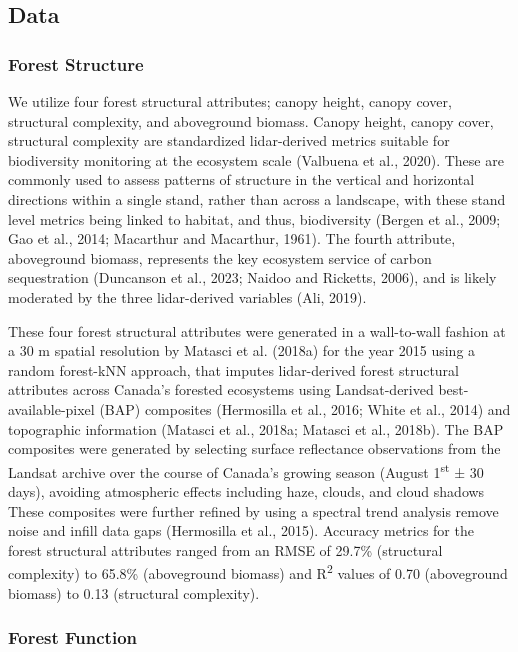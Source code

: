 \documentclass[
]{agujournal2019}
\begin{document}
\subsection{Data}\label{data}

\subsubsection{Forest Structure}\label{forest-structure}

We utilize four forest structural attributes; canopy height, canopy
cover, structural complexity, and aboveground biomass. Canopy height,
canopy cover, structural complexity are standardized lidar-derived
metrics suitable for biodiversity monitoring at the ecosystem scale
(Valbuena et al., 2020). These are commonly used to assess patterns of
structure in the vertical and horizontal directions within a single
stand, rather than across a landscape, with these stand level metrics
being linked to habitat, and thus, biodiversity (Bergen et al., 2009;
Gao et al., 2014; Macarthur and Macarthur, 1961). The fourth attribute,
aboveground biomass, represents the key ecosystem service of carbon
sequestration (Duncanson et al., 2023; Naidoo and Ricketts, 2006), and
is likely moderated by the three lidar-derived variables (Ali, 2019).

These four forest structural attributes were generated in a wall-to-wall
fashion at a 30 m spatial resolution by Matasci et al. (2018a) for the
year 2015 using a random forest-kNN approach, that imputes lidar-derived
forest structural attributes across Canada's forested ecosystems using
Landsat-derived best-available-pixel (BAP) composites (Hermosilla et
al., 2016; White et al., 2014) and topographic information (Matasci et
al., 2018a; Matasci et al., 2018b). The BAP composites were generated by
selecting surface reflectance observations from the Landsat archive over
the course of Canada's growing season (August 1\textsuperscript{st} ± 30
days), avoiding atmospheric effects including haze, clouds, and cloud
shadows These composites were further refined by using a spectral trend
analysis remove noise and infill data gaps (Hermosilla et al., 2015).
Accuracy metrics for the forest structural attributes ranged from an
RMSE of 29.7\% (structural complexity) to 65.8\% (aboveground biomass)
and R\textsuperscript{2} values of 0.70 (aboveground biomass) to 0.13
(structural complexity).

\subsubsection{Forest Function}\label{forest-function}
\end{document}
